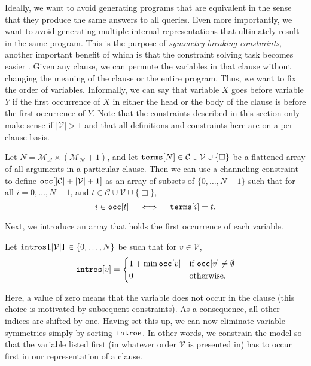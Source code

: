 \documentclass[runningheads]{llncs}
\newcommand{\variable}[1]{\texttt{\textup{#1}}}
\newcommand{\arrayd}[3]{\variable{{#1}[}{#2}\variable{]} \in {#3}}
\newcommand{\variables}{\mathcal{V}}
\newcommand{\constants}{\mathcal{C}}
\newcommand{\maxArity}{\mathcal{M}_{\mathcal{A}}}
\newcommand{\maxNumNodes}{\mathcal{M}_{\mathcal{N}}}
\begin{document}
Ideally, we want to avoid generating programs that are equivalent in the sense
that they produce the same answers to all queries. Even more importantly, we
want to avoid generating multiple internal representations that ultimately
result in the same program. This is the purpose of \emph{symmetry-breaking
  constraints}, another important benefit of which is that the constraint
solving task becomes easier \cite{DBLP:conf/cp/Walsh06}. Given any clause, we
can permute the variables in that clause without changing the meaning of the
clause or the entire program. Thus, we want to fix the order of variables.
Informally, we can say that variable $X$ goes before variable $Y$ if the first
occurrence of $X$ in either the head or the body of the clause is before the
first occurrence of $Y$. Note that the constraints described in this section
only make sense if $|\variables{}| > 1$ and that all definitions and constraints
here are on a per-clause basis.
\begin{definition}
  Let $N = \maxArity{} \times (\maxNumNodes{} + 1)$, and let
  $\variable{terms}[N] \in \constants{} \cup \variables{} \cup \{ \Box
  \}$ be a flattened array of all arguments in a particular clause. Then we can
  use a channeling constraint to define $\variable{occ}[|\constants{}| +
  |\variables{}| + 1]$ as an array of subsets of $\{ 0, \dots, N-1 \}$ such that
  for all $i = 0, \dots, N - 1$, and $t \in \constants{} \cup \variables{} \cup
  \{ \Box \}$,
  \[
    i \in \variable{occ}[t] \quad \iff \quad
    \variable{terms}[i] = t.
  \]
\end{definition}
Next, we introduce an array that holds the first occurrence of each variable.
\begin{definition}
  Let $\arrayd{intros}{|\variables{}|}{\{ 0, \dots, N \}}$ be such that
  for $v \in \variables{}$,
  \[
    \variable{intros}[v] = \begin{cases}
      1 + \min \variable{occ}[v] & \text{if }
      \variable{occ}[v] \ne \emptyset\\
      0 & \text{otherwise.}
    \end{cases}
  \]
\end{definition}
Here, a value of zero means that the variable does not occur in the clause (this
choice is motivated by subsequent constraints). As a consequence, all other
indices are shifted by one. Having set this up, we can now eliminate variable
symmetries simply by sorting $\variable{intros}$. In other words, we constrain
the model so that the variable listed first (in whatever order $\variables{}$ is
presented in) has to occur first in our representation of a clause.
\end{document}
